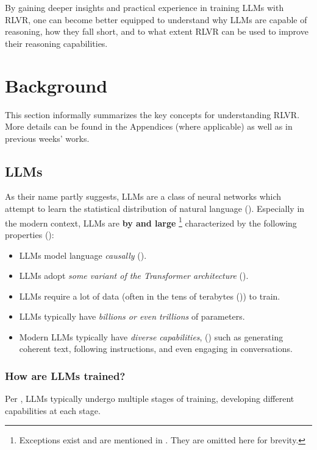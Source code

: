 \documentclass{article} %
\theoremstyle{definition}
\begin{document}
By gaining deeper insights and practical experience in training LLMs with RLVR,
one can become better equipped to understand why LLMs are capable of reasoning,
how they fall short, and to what extent RLVR can be used to improve their reasoning capabilities.

\section{Background}

This section informally summarizes the key concepts for understanding
RLVR. More details can be found in the Appendices (where applicable)
as well as in previous weeks' works.

\subsection{LLMs}
As their name partly suggests, LLMs are a class of neural networks 
which attempt to learn the statistical distribution of natural language
(\cite{Zhao-et-al-2023, Karpathy-2025}). Especially in the modern context,
LLMs are \textbf{by and large} \footnote{Exceptions exist and are mentioned in \cite{wk5}. They are omitted here for brevity.} characterized by the following properties (\cite{wk5}):
\begin{itemize}
    \item LLMs model language \textit{causally} (\cite{Jurafsky-2024, Karpathy-2025}).
    \item LLMs adopt \textit{some variant of the Transformer architecture} (\cite{Vaswani-et-al-2017}).
    \item LLMs require a lot of data (often in the tens of terabytes (\cite{Karpathy-2025})) to train.
    \item LLMs typically have \textit{billions or even trillions} of parameters.
    \item Modern LLMs typically have \textit{diverse capabilities}, (\cite{Brown-et-al-2020})
        such as generating coherent text, following instructions, 
        and even engaging in conversations.
\end{itemize}

\subsubsection{How are LLMs trained?}
Per \cite{Karpathy-2025}, LLMs typically undergo multiple stages of training,
developing different capabilities at each stage.
\end{document}
